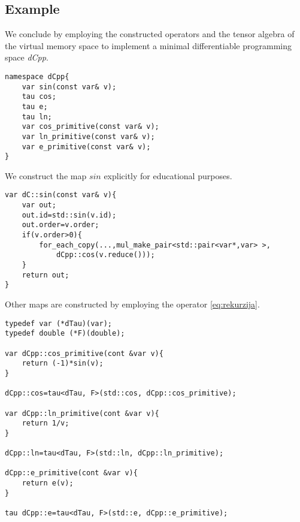 \subsection{Example}

We conclude by employing the constructed operators and the tensor algebra of the virtual memory space to implement a minimal differentiable programming space \emph{dCpp}.

\begin{lstlisting}
namespace dCpp{
    var sin(const var& v);
    tau cos;
    tau e;
    tau ln;
    var cos_primitive(const var& v);
    var ln_primitive(const var& v);
    var e_primitive(const var& v);
}
\end{lstlisting}

We construct the map $sin$ explicitly for educational purposes.

\begin{lstlisting}
var dC::sin(const var& v){
    var out;
    out.id=std::sin(v.id);
    out.order=v.order;
    if(v.order>0){
    	for_each_copy(...,mul_make_pair<std::pair<var*,var> >,
    		dCpp::cos(v.reduce()));
    }
    return out;
}
\end{lstlisting}
Other maps are constructed by employing the operator \eqref{eq:rekurzija}.
\begin{lstlisting}
typedef var (*dTau)(var);
typedef double (*F)(double);

var dCpp::cos_primitive(cont &var v){
    return (-1)*sin(v);
}

dCpp::cos=tau<dTau, F>(std::cos, dCpp::cos_primitive);

var dCpp::ln_primitive(cont &var v){
    return 1/v;
}

dCpp::ln=tau<dTau, F>(std::ln, dCpp::ln_primitive);

dCpp::e_primitive(cont &var v){
    return e(v);
}

tau dCpp::e=tau<dTau, F>(std::e, dCpp::e_primitive);

\end{lstlisting}
